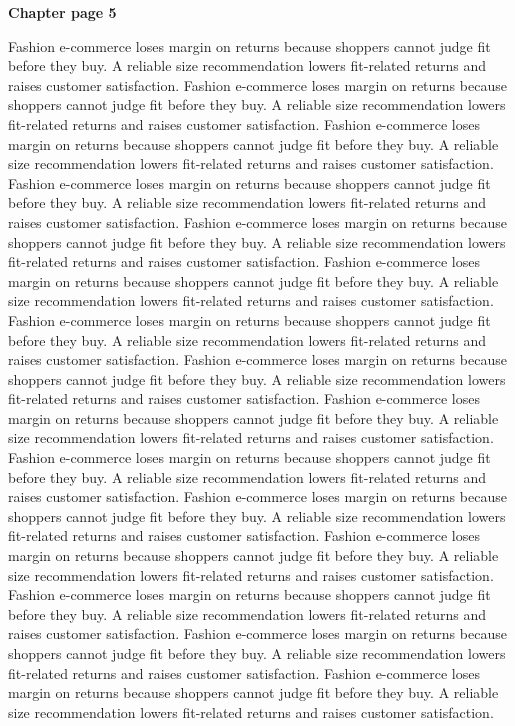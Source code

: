 \documentclass[a4paper,11pt]{article}
\begin{document}
{\headfont\bfseries\Large Chapter page 5}\par\medskip
Fashion e-commerce loses margin on returns because shoppers cannot judge fit before they buy. A reliable size recommendation lowers fit-related returns and raises customer satisfaction. Fashion e-commerce loses margin on returns because shoppers cannot judge fit before they buy. A reliable size recommendation lowers fit-related returns and raises customer satisfaction. Fashion e-commerce loses margin on returns because shoppers cannot judge fit before they buy. A reliable size recommendation lowers fit-related returns and raises customer satisfaction. Fashion e-commerce loses margin on returns because shoppers cannot judge fit before they buy. A reliable size recommendation lowers fit-related returns and raises customer satisfaction. Fashion e-commerce loses margin on returns because shoppers cannot judge fit before they buy. A reliable size recommendation lowers fit-related returns and raises customer satisfaction. 
Fashion e-commerce loses margin on returns because shoppers cannot judge fit before they buy. A reliable size recommendation lowers fit-related returns and raises customer satisfaction. Fashion e-commerce loses margin on returns because shoppers cannot judge fit before they buy. A reliable size recommendation lowers fit-related returns and raises customer satisfaction. Fashion e-commerce loses margin on returns because shoppers cannot judge fit before they buy. A reliable size recommendation lowers fit-related returns and raises customer satisfaction. Fashion e-commerce loses margin on returns because shoppers cannot judge fit before they buy. A reliable size recommendation lowers fit-related returns and raises customer satisfaction. Fashion e-commerce loses margin on returns because shoppers cannot judge fit before they buy. A reliable size recommendation lowers fit-related returns and raises customer satisfaction. 
Fashion e-commerce loses margin on returns because shoppers cannot judge fit before they buy. A reliable size recommendation lowers fit-related returns and raises customer satisfaction. Fashion e-commerce loses margin on returns because shoppers cannot judge fit before they buy. A reliable size recommendation lowers fit-related returns and raises customer satisfaction. Fashion e-commerce loses margin on returns because shoppers cannot judge fit before they buy. A reliable size recommendation lowers fit-related returns and raises customer satisfaction. Fashion e-commerce loses margin on returns because shoppers cannot judge fit before they buy. A reliable size recommendation lowers fit-related returns and raises customer satisfaction. Fashion e-commerce loses margin on returns because shoppers cannot judge fit before they buy. A reliable size recommendation lowers fit-related returns and raises customer satisfaction. \newpage
\end{document}
